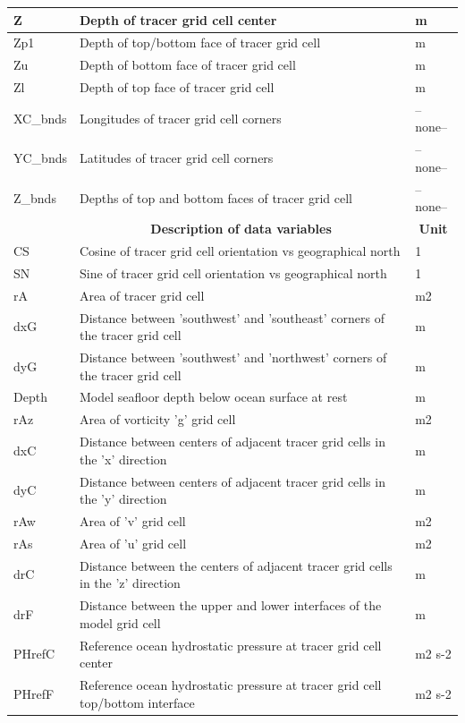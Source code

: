 \begin{longtable}{|m{}|m{}|m{}|}
Z &Depth of tracer grid cell center &m  \\ \hline
Zp1 &Depth of top/bottom face of tracer grid cell &m  \\ \hline
Zu &Depth of bottom face of tracer grid cell &m  \\ \hline
Zl &Depth of top face of tracer grid cell &m  \\ \hline
XC\_bnds &Longitudes of tracer grid cell corners &--none--  \\ \hline
YC\_bnds &Latitudes of tracer grid cell corners &--none--  \\ \hline
Z\_bnds &Depths of top and bottom faces of tracer grid cell &--none--  \\ \hline
\rowcolor{lightgray} \multicolumn{1}{|c|}{\textbf{Variables}} & \multicolumn{1}{|c|}{\textbf{Description of data variables}} &  \multicolumn{1}{|c|}{\textbf{Unit}}\\ \hline
CS &Cosine of tracer grid cell orientation vs geographical north &1  \\ \hline
SN &Sine of tracer grid cell orientation vs geographical north &1  \\ \hline
rA &Area of tracer grid cell &m2  \\ \hline
dxG &Distance between 'southwest' and 'southeast' corners of the tracer grid cell &m  \\ \hline
dyG &Distance between 'southwest' and 'northwest' corners of the tracer grid cell &m  \\ \hline
Depth &Model seafloor depth below ocean surface at rest &m  \\ \hline
rAz &Area of vorticity 'g' grid cell &m2  \\ \hline
dxC &Distance between centers of adjacent tracer grid cells in the 'x' direction &m  \\ \hline
dyC &Distance between centers of adjacent tracer grid cells in the 'y' direction &m  \\ \hline
rAw &Area of 'v' grid cell &m2  \\ \hline
rAs &Area of 'u' grid cell &m2  \\ \hline
drC &Distance between the centers of adjacent tracer grid cells in the 'z' direction &m  \\ \hline
drF &Distance between the upper and lower interfaces of the model grid cell &m  \\ \hline
PHrefC &Reference ocean hydrostatic pressure at tracer grid cell center &m2 s-2  \\ \hline
PHrefF &Reference ocean hydrostatic pressure at tracer grid cell top/bottom interface &m2 s-2  \\ \hline

\end{longtable}
